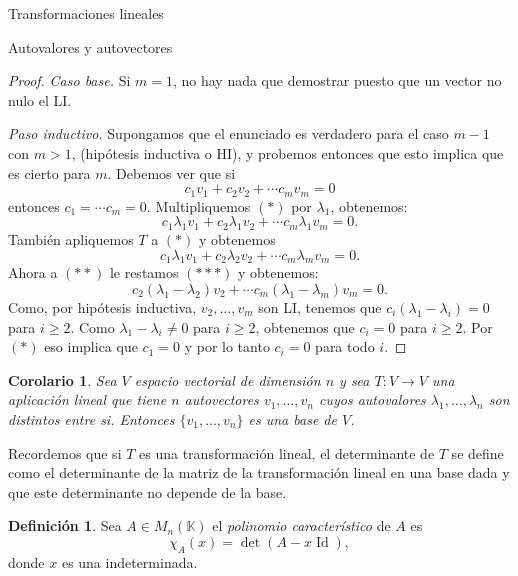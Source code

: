 \documentclass[a4paper,12pt,twoside,spanish,reqno]{amsbook}
\newtheorem{corolario}[teorema]{Corolario}
\theoremstyle{definition}
\newtheorem{definicion}{Definici\'on}[section]
\theoremstyle{remark}
\newcommand{\Id}{\operatorname{Id}}
\newcommand{\K}{\mathbb K}
\begin{document}
\begin{chapter}{Transformaciones lineales}
\begin{section}{Autovalores y autovectores}
\begin{proof}
			\textit{Caso base.} Si $m=1$, no hay nada que demostrar puesto que un vector no nulo el LI.
			
			\medskip
			
			\textit{Paso inductivo.} Supongamos que el enunciado es verdadero para el caso $m-1$ con $m>1$, (hipótesis inductiva o HI), y probemos entonces que esto implica que es cierto para $m$. Debemos ver  que si 
			\begin{equation}
			c_1v_1+	c_2v_2+ \cdots c_mv_m = 0 \tag{$*$}
			\end{equation}
			entonces $c_1 = \cdots c_m = 0$.
			Multipliquemos $(*)$ por $\lambda_1$, obtenemos:
			\begin{equation}
			c_1\lambda_1v_1+ c_2\lambda_1v_2+\cdots c_m\lambda_1v_m = 0. \tag{$**$}
			\end{equation}
			También apliquemos $T$ a $(*)$ y obtenemos
			\begin{equation}
			c_1\lambda_1v_1+ c_2\lambda_2v_2+\cdots c_m\lambda_mv_m = 0. \tag{$***$}
			\end{equation}
			Ahora a $(**)$ le restamos $(***)$ y obtenemos:
			\begin{equation}
			c_2(\lambda_1 -\lambda_2)v_2+\cdots c_m(\lambda_1 -\lambda_m)v_m = 0. 	 
			\end{equation}
			Como, por hipótesis inductiva, $v_2,\ldots,v_m$ son LI, tenemos que $c_i(\lambda_1 -\lambda_i)=0$ para $i\ge 2$. Como $\lambda_1 -\lambda_i \ne 0$ para $i\ge 2$, obtenemos que $c_i = 0$ para $i\ge 2$. Por $(*)$ eso implica que $c_1=0$ y por lo tanto $c_i=0$ para todo $i$.
		\end{proof}
		
		\begin{corolario}\label{cor-aut-li}
			Sea $V$ espacio vectorial de dimensión $n$ y sea $T: V \to V$ una aplicación lineal que tiene $n$
			autovectores $v_1,\ldots, v_n$ cuyos autovalores $\lambda_1,\ldots,\lambda_n$ son distintos entre
			si. Entonces $\{v_1,\ldots, v_n\}$ es una base de $V$.
		\end{corolario}
		
		Recordemos que si $T$  es una transformación lineal, el determinante de $T$  se define como el determinante de la matriz de la transformación lineal en una base dada y que este determinante no depende de la base.    
		
		\begin{definicion}
			Sea $A \in M_n(\K)$   el \textit{polinomio característico} de $A$ es $$\chi_A(x) = \det(A-x \Id),$$ donde $x$ es una indeterminada. 
			

\end{definicion}
\end{section}
\end{chapter}
\end{document}
